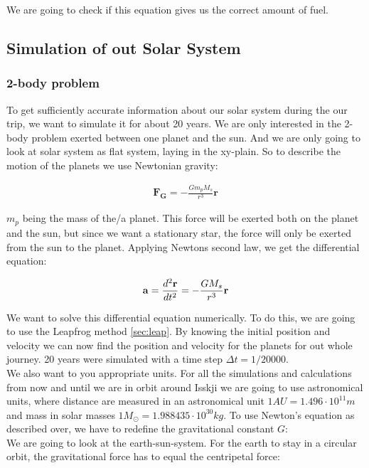 \documentclass[a4paper, 10pt]{article}
\begin{document}
We are going to check if this equation gives us the correct amount of fuel.

\subsection{Simulation of out Solar System}
\subsubsection{2-body problem}
To get sufficiently accurate information about our solar system during the our trip, we want to simulate it for about 20 years. We are only interested in the 2-body problem exerted between one planet and the sun. And we are only going to look at solar system as flat system, laying in the xy-plain. So to describe the motion of the planets we use Newtonian gravity:

\begin{align}
\textbf{F}_\textbf{G} = -\frac{Gm_p M_s}{r^{3}}\textbf{r}
\end{align}

$m_p$ being the mass of the/a planet. This force will be exerted both on the planet and the sun, but since we want a stationary star, the force will only be exerted from the sun to the planet. Applying Newtons second law, we get the differential equation:

$$
\bold{a} = \frac{d^{2}\textbf{r}}{dt^{2}}  = -\frac{G M_s}{r^{3}}\textbf{r}
$$ 


We want to solve this differential equation numerically. To do this, we are going to use the Leapfrog method \ref{sec:leap}. By knowing the initial position and velocity we can now find the position and velocity for the planets for out whole journey. 20 years were simulated with a time step $\Delta t = 1/20000.$\\

We also want to you appropriate units. For all the simulations and calculations from now and until we are in orbit around Isskji we are going to use astronomical units, where distance are measured in an astronomical unit $1 AU = 1.496 \cdot 10^{11} m$ and mass in solar masses $1 M_{\odot} = 1.988435 \cdot 10^{30} kg$. To use Newton's equation as described over, we have to redefine the gravitational constant $G$: \\

We are going to look at the earth-sun-system. For the earth to stay in a circular orbit, the gravitational force has to equal the centripetal force:
\end{document}
